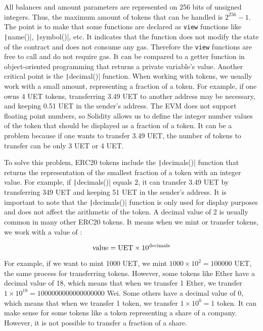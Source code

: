 All balances and amount parameters are represented on 256 bits of unsigned integers. Thus, the maximum amount of tokens that can be handled is $2^{256} - 1$. The point is to make that some functions are declared as \texttt{view} functions
like \texttt|name()|, \texttt|symbol()|, etc. It indicates that the function does not modify the state of the contract and does not consume any gas. Therefore the \texttt{view} functions are free to call and do not require gas.
It can be compared to a getter function in object-oriented programming that returns a private variable's value. Another critical point is the \texttt|decimal()| function. When working
with tokens, we usually work with a small amount, representing a fraction of a token. For example, if one owns 4 UET tokens, transferring 3.49 UET to another address may be necessary, and keeping 0.51 UET in the sender's address. The EVM does not support floating point numbers, so Solidity allows us to define the integer number values of the token that should be displayed as a fraction of a token.
It can be a problem because if one wants to transfer 3.49 UET, the number of tokens to transfer can be only 3 UET or 4 UET.

To solve this problem, ERC20 tokens include the \texttt|decimals()| function that returns the representation of the smallest fraction of a token with
an integer value. For example, if \texttt|decimals()| equals $2$, it can transfer 3.49 UET by transferring 349 UET and keeping 51 UET in the sender's address. It is important to note that the \texttt|decimals()| function is only used for display purposes
and does not affect the arithmetic of the token. A decimal value of 2 is usually common in many other ERC20 tokens. It means when we mint or transfer tokens, we work with a value of :

\begin{center}
    \begin{equation}
        \centering
        \text{value} = \text{UET} \times 10^{\text{decimals}}
    \end{equation}
    \label{eq:decimals}
 \end{center}
 
 
 For example, if we want to mint 1000 UET, we mint $1000 \times 10^2 = 100000$ UET, the same process for transferring tokens. However, some tokens
 like Ether have a decimal value of 18, which means that when we transfer 1 Ether, we transfer $1 \times 10^{18} = 1000000000000000000$ Wei. Some others have a decimal value of 0,
 which means that when we transfer 1 token, we transfer $1 \times 10^0 = 1$ token. It can make sense for some tokens like a token representing a share of a company. However, it is not possible to transfer
 a fraction of a share. 

